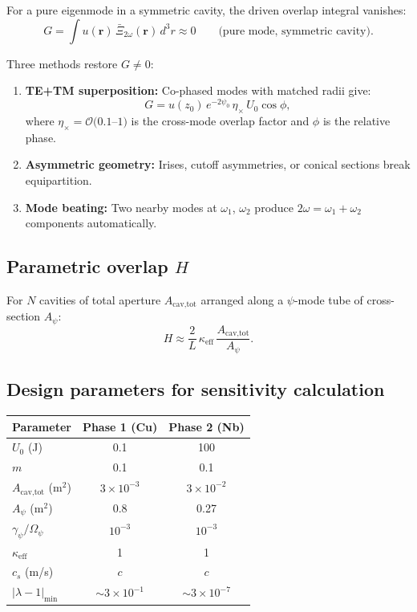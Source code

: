 \documentclass[12pt,letterpaper]{article}
\begin{document}
For a pure eigenmode in a symmetric cavity, the driven overlap integral
vanishes:
\begin{equation}
  G = \int u(\mathbf{r})\,\bar{\Xi}_{2\omega}(\mathbf{r})\,d^3r
  \approx 0
  \qquad\text{(pure mode, symmetric cavity)}.
\end{equation}

Three methods restore $G \neq 0$:

\begin{enumerate}
  \item \textbf{TE+TM superposition:} Co-phased modes with matched
    radii give:
    \begin{equation}
      G = u(z_0)\,e^{-2\psi_0}\,\eta_\times\,U_0\cos\phi,
    \end{equation}
    where $\eta_\times = \mathcal{O}(0.1$--$1)$ is the cross-mode
    overlap factor and $\phi$ is the relative phase.

  \item \textbf{Asymmetric geometry:} Irises, cutoff asymmetries, or
    conical sections break equipartition.

  \item \textbf{Mode beating:} Two nearby modes at $\omega_1$, $\omega_2$
    produce $2\omega = \omega_1 + \omega_2$ components automatically.
\end{enumerate}

\subsection{Parametric overlap $H$}

For $N$ cavities of total aperture $A_{\text{cav,tot}}$ arranged along
a $\psi$-mode tube of cross-section $A_\psi$:
\begin{equation}
  H \approx \frac{2}{L}\,\kappa_{\text{eff}}\,
    \frac{A_{\text{cav,tot}}}{A_\psi}.
\end{equation}

\subsection{Design parameters for sensitivity calculation}

\begin{center}
\begin{tabular}{lcc}
\toprule
Parameter & Phase 1 (Cu) & Phase 2 (Nb) \\
\midrule
$U_0$ (J) & 0.1 & 100 \\
$m$ & 0.1 & 0.1 \\
$A_{\text{cav,tot}}$ (m$^2$) & $3\times 10^{-3}$ & $3\times 10^{-2}$ \\
$A_\psi$ (m$^2$) & 0.8 & 0.27 \\
$\gamma_\psi/\Omega_\psi$ & $10^{-3}$ & $10^{-3}$ \\
$\kappa_{\text{eff}}$ & 1 & 1 \\
$c_s$ (m/s) & $c$ & $c$ \\
\midrule
$|\lambda - 1|_{\text{min}}$ & $\sim 3\times 10^{-1}$ & $\sim 3\times 10^{-7}$ \\
\bottomrule
\end{tabular}
\end{center}
\end{document}
